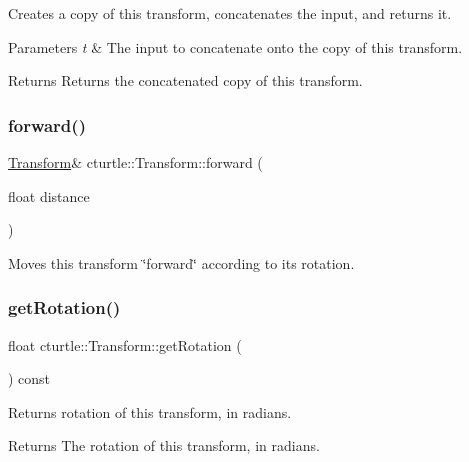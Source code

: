 Creates a copy of this transform, concatenates the input, and returns it. 


\begin{DoxyParams}{Parameters}
{\em t} & The input to concatenate onto the copy of this transform. \\
\hline
\end{DoxyParams}
\begin{DoxyReturn}{Returns}
Returns the concatenated copy of this transform. 
\end{DoxyReturn}
\mbox{\label{classcturtle_1_1Transform_ae0a81b79c7e737eadd880c20624acae3}} 
\subsubsection{\texorpdfstring{forward()}{forward()}}
{\footnotesize\ttfamily \hyperlink{classcturtle_1_1Transform}{Transform}\& cturtle\+::\+Transform\+::forward (\begin{DoxyParamCaption}\item[{float}]{distance }\end{DoxyParamCaption})\hspace{0.3cm}{\ttfamily [inline]}}

Moves this transform \char`\"{}forward\char`\"{} according to its rotation. \mbox{\label{classcturtle_1_1Transform_a1c879c9c239ca3a6af2d85c73b7e39b8}} 
\subsubsection{\texorpdfstring{get\+Rotation()}{getRotation()}}
{\footnotesize\ttfamily float cturtle\+::\+Transform\+::get\+Rotation (\begin{DoxyParamCaption}{ }\end{DoxyParamCaption}) const\hspace{0.3cm}{\ttfamily [inline]}}



Returns rotation of this transform, in radians. 

\begin{DoxyReturn}{Returns}
The rotation of this transform, in radians. 
\end{DoxyReturn}
\mbox{\label{classcturtle_1_1Transform_ac7ab4863a65f6ee7d222be6bb01cc54c}} 
